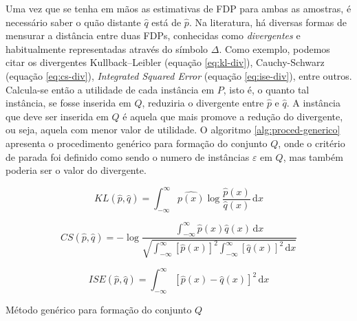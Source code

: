 Uma vez que se tenha em mãos as estimativas de FDP para ambas as amostras, é necessário saber o quão distante $\hat{q}$ está de $\hat{p}$. Na literatura, há diversas formas de mensurar a distância entre duas FDPs, conhecidas como \textit{divergentes} e habitualmente representadas através do símbolo $\Delta$. Como exemplo, podemos citar os divergentes Kullback–Leibler (equação \ref{eq:kl-div}), Cauchy-Schwarz (equação \ref{eq:cs-div}), \textit{Integrated Squared Error} (equação \ref{eq:ise-div}), entre outros. Calcula-se então a utilidade de cada instância em $P$, isto é, o quanto tal instância, se fosse inserida em $Q$, reduziria o divergente entre $\hat{p}$ e $\hat{q}$. A instância que deve ser inserida em $Q$ é aquela que mais promove a redução do divergente, ou seja, aquela com menor valor de utilidade. O algoritmo \ref{alg:proced-generico} apresenta o procedimento genérico para formação do conjunto $Q$, onde o critério de parada foi definido como sendo o numero de instâncias $\varepsilon$ em $Q$, mas também poderia ser o valor do divergente.

\begin{equation}
KL(\hat{p}, \hat{q}) = \int_{-\infty}^{\infty} \hat{p(x)} \log \frac{\hat{p}(x)}{\hat{q}(x)} \,\mathrm{d}x 
\label{eq:kl-div}
\end{equation}

\begin{equation}
CS(\hat{p}, \hat{q}) = -\log \frac{\int_{-\infty}^{\infty} \hat{p}(x)\hat{q}(x)\,\mathrm{d}x}{\sqrt{\int_{-\infty}^{\infty} [\hat{p}(x)]^2 \int_{-\infty}^{\infty} [\hat{q}(x)]^2\,\mathrm{d}x}}
\label{eq:cs-div}
\end{equation}

\begin{equation}
ISE(\hat{p}, \hat{q}) = \int_{-\infty}^{\infty} [\hat{p}(x) - \hat{q}(x)]^2 \,\mathrm{d}x
\label{eq:ise-div}
\end{equation}

\begin{algorithm}
\caption{Método genérico para formação do conjunto $Q$} 
\begin{algorithmic}[1]
    \EndFor
\EndWhile
\end{algorithmic}
\label{alg:proced-generico}
\end{algorithm}

